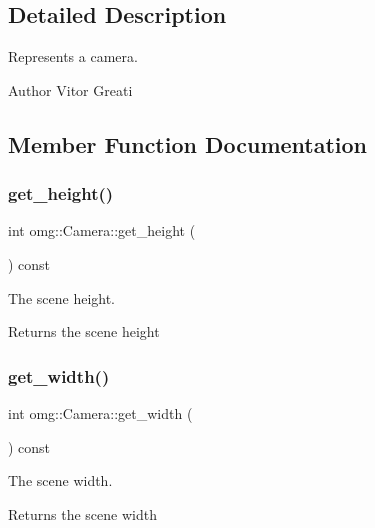\subsection{Detailed Description}
Represents a camera. 

\begin{DoxyAuthor}{Author}
Vitor Greati 
\end{DoxyAuthor}


\subsection{Member Function Documentation}
\mbox{\label{classomg_1_1_camera_a4003f1cf690980d47b3307e6eefe3003}} 
\subsubsection{\texorpdfstring{get\_height()}{get\_height()}}
{\footnotesize\ttfamily int omg\+::\+Camera\+::get\+\_\+height (\begin{DoxyParamCaption}{ }\end{DoxyParamCaption}) const\hspace{0.3cm}{\ttfamily [inline]}}



The scene height. 

\begin{DoxyReturn}{Returns}
the scene height 
\end{DoxyReturn}
\mbox{\label{classomg_1_1_camera_a9d27ce6b9428503ad27e0247deb65bba}} 
\subsubsection{\texorpdfstring{get\_width()}{get\_width()}}
{\footnotesize\ttfamily int omg\+::\+Camera\+::get\+\_\+width (\begin{DoxyParamCaption}{ }\end{DoxyParamCaption}) const\hspace{0.3cm}{\ttfamily [inline]}}



The scene width. 

\begin{DoxyReturn}{Returns}
the scene width 
\end{DoxyReturn}
\mbox{\label{classomg_1_1_camera_a75d3baca3bae25365e5d3dddc005676e}} 
